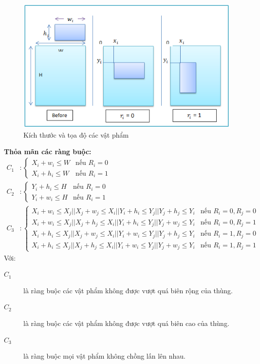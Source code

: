 \begin{figure}[H]
	\centering
	\includegraphics[scale=1]{figures/items-pos.png}
	\caption{Kích thước và tọa độ các vật phẩm\label{fig:itemPositions}}
\end{figure}

\textbf{Thỏa mãn các ràng buộc:}
\begin{align}
	C_1 &: 
	\begin{cases}
		X_i + w_i \leq W &\text{nếu } R_i = 0 \\
		X_i + h_i \leq W &\text{nếu } R_i = 1
	\end{cases}
	\\
	C_2 &: 
	\begin{cases}
		Y_i + h_i \leq H &\text{nếu } R_i = 0 \\
		Y_i + w_i \leq H &\text{nếu } R_i = 1
	\end{cases}
	\\
	C_3 &: 
	\begin{cases}
		X_i + w_i \leq X_j || X_j + w_j \leq X_i || Y_i + h_i \leq Y_j || Y_j + h_j \leq Y_i &\text{nếu }R_i = 0, R_j = 0 \\ 
		X_i + w_i \leq X_j || X_j + h_j \leq X_i || Y_i + h_i \leq Y_j || Y_j + w_j \leq Y_i &\text{nếu }R_i = 0, R_j = 1 \\ 
		X_i + h_i \leq X_j || X_j + w_j \leq X_i || Y_i + w_i \leq Y_j || Y_j + h_j \leq Y_i &\text{nếu }R_i = 1, R_j = 0 \\ 
		X_i + h_i \leq X_j || X_j + h_j \leq X_i || Y_i + w_i \leq Y_j || Y_j + w_j \leq Y_i &\text{nếu }R_i = 1, R_j = 1
	\end{cases}
\end{align}
Với:
\begin{description}
	\item[$C_1$] là ràng buộc các vật phẩm không được vượt quá biên rộng của thùng.
	\item[$C_2$] là ràng buộc các vật phẩm không được vượt quá biên cao của thùng.
	\item[$C_3$] là ràng buộc mọi vật phẩm không chồng lấn lên nhau.
\end{description}

